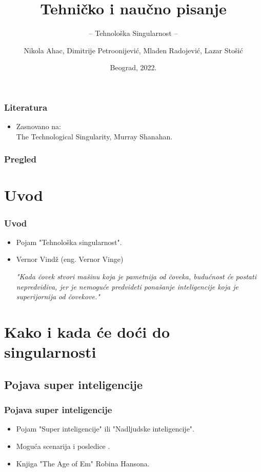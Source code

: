 \documentclass{beamer}
\title{Tehničko i naučno pisanje}
\subtitle{-- Tehnološka Singularnost --}
\author{Nikola Ahac, Dimitrije Petroonijević, Mladen Radojević, Lazar Stošić}
\institute{Matematički fakultet\\Univerzitet u Beogradu}
\date{
	\footnotesize{Beograd, 2022.}	
}
\begin{document}
\begin{frame}
	\thispagestyle{empty}
	\titlepage
\end{frame}

\addtocounter{framenumber}{-1}

\begin{frame}[fragile]\frametitle{Literatura}
	\begin{itemize}
		\item Zasnovano na:\\
		The Technological Singularity, Murray Shanahan.
	\end{itemize}
\end{frame}

\begin{frame}
	\frametitle{Pregled} %
	\tableofcontents[hidesubsections] 
\end{frame}
\section{Uvod}

\begin{frame}[fragile]\frametitle{Uvod}
	\begin{itemize}	
		\item Pojam "Tehnološka singularnost".
		\item Vernor Vindž (eng. Vernor Vinge)
              
              \textit {"Kada čovek stvori mašinu koja je pametnija od čoveka, budućnost će postati nepredvidiva, jer je nemoguće predvideti ponašanje inteligencije koja je superijornija od čovekove."}

	\end{itemize}
\end{frame}

\section{Kako i kada će doći do singularnosti}
\subsection{Pojava super inteligencije}
\begin{frame}[fragile]\frametitle{Pojava super inteligencije}
	\begin{itemize}	
		\item Pojam "Super inteligencije" ili "Nadljudske inteligencije".
        \item Moguća scenarija i posledice .
        \item Knjiga "The Age of Em" Robina Hansona.
	\end{itemize}
\end{frame}
\end{document}
